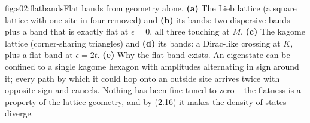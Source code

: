 %
%
\begin{aqmfigure}{fig:s02:flatbands}{Flat bands from geometry alone. \textbf{(a)} The Lieb lattice
(a square lattice with one site in four removed) and \textbf{(b)} its bands: two dispersive bands
plus a band that is exactly flat at $\epsilon=0$, all three touching at $M$. \textbf{(c)} The
kagome lattice (corner-sharing triangles) and \textbf{(d)} its bands: a Dirac-like crossing at $K$,
plus a flat band at $\epsilon=2t$. \textbf{(e)} Why the flat band exists. An eigenstate can be
confined to a single kagome hexagon with amplitudes alternating in sign around it; every path by
which it could hop onto an outside site arrives twice with opposite sign and cancels. Nothing has
been fine-tuned to zero -- the flatness is a property of the lattice geometry, and by (2.16) it
makes the density of states diverge.}

\end{aqmfigure}

